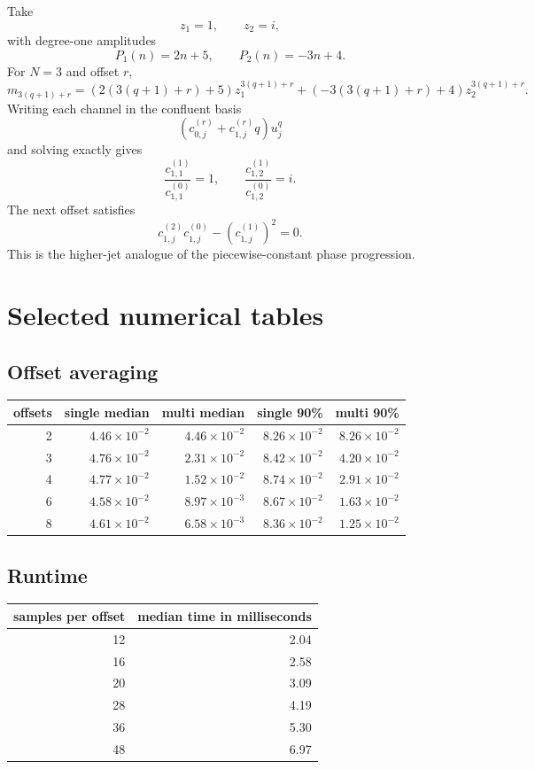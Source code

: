 \documentclass[11pt]{article}
\theoremstyle{remark}
\begin{document}
Take
\[
z_1=1,
\qquad
z_2=i,
\]
with degree-one amplitudes
\[
P_1(n)=2n+5,
\qquad
P_2(n)=-3n+4.
\]
For $N=3$ and offset $r$,
\[
m_{3(q+1)+r}
=(2(3(q+1)+r)+5)z_1^{3(q+1)+r}
+(-3(3(q+1)+r)+4)z_2^{3(q+1)+r}.
\]
Writing each channel in the confluent basis
\[
(c_{0,j}^{(r)}+c_{1,j}^{(r)}q)u_j^q
\]
and solving exactly gives
\[
\frac{c_{1,1}^{(1)}}{c_{1,1}^{(0)}}=1,
\qquad
\frac{c_{1,2}^{(1)}}{c_{1,2}^{(0)}}=i.
\]
The next offset satisfies
\[
c_{1,j}^{(2)}c_{1,j}^{(0)}-(c_{1,j}^{(1)})^2=0.
\]
This is the higher-jet analogue of the piecewise-constant phase progression.

\section{Selected numerical tables}

\subsection{Offset averaging}
\begin{center}
\begin{tabular}{rrrrr}
\toprule
offsets&single median&multi median&single 90\%&multi 90\%\\
\midrule
2&$4.46\times10^{-2}$&$4.46\times10^{-2}$&$8.26\times10^{-2}$&$8.26\times10^{-2}$\\
3&$4.76\times10^{-2}$&$2.31\times10^{-2}$&$8.42\times10^{-2}$&$4.20\times10^{-2}$\\
4&$4.77\times10^{-2}$&$1.52\times10^{-2}$&$8.74\times10^{-2}$&$2.91\times10^{-2}$\\
6&$4.58\times10^{-2}$&$8.97\times10^{-3}$&$8.67\times10^{-2}$&$1.63\times10^{-2}$\\
8&$4.61\times10^{-2}$&$6.58\times10^{-3}$&$8.36\times10^{-2}$&$1.25\times10^{-2}$\\
\bottomrule
\end{tabular}
\end{center}

\subsection{Runtime}
\begin{center}
\begin{tabular}{rr}
\toprule
samples per offset&median time in milliseconds\\
\midrule
12&2.04\\
16&2.58\\
20&3.09\\
28&4.19\\
36&5.30\\
48&6.97\\
\bottomrule
\end{tabular}
\end{center}
\end{document}

